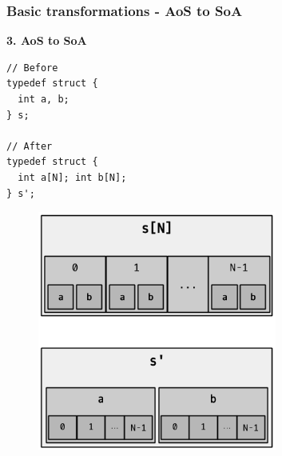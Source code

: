 \begin{frame}[fragile]
\frametitle{Basic transformations - AoS to SoA}

\begin{center}
\begin{minipage}{0.3\linewidth}
\textbf{\small 3. AoS to SoA}
\begin{lstlisting}[style=Cstyle, basicstyle=\scriptsize]
// Before
typedef struct {
  int a, b;
} s;

// After
typedef struct {
  int a[N]; int b[N];
} s';
\end{lstlisting}
\end{minipage}%
\begin{minipage}{0.5\linewidth}
\begin{figure}
	\centering
	\includegraphics[width=0.7\textwidth]{images/soa}
\end{figure}
\end{minipage}
\end{center}

\end{frame}


